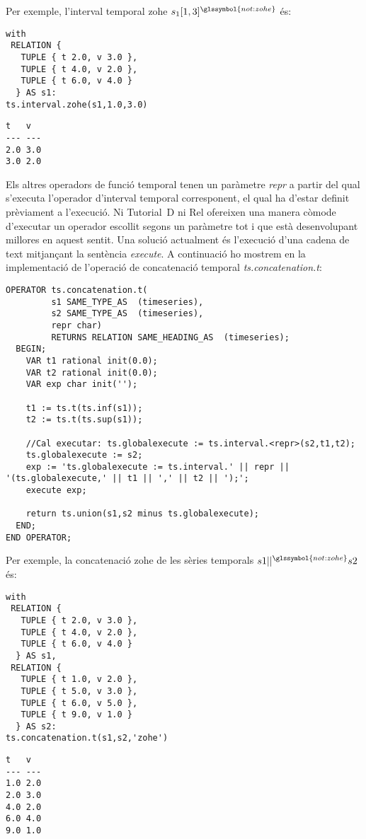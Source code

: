 Per exemple, l'interval temporal \gls{zohe} $s_1[1,3]^{\glssymbol{not:zohe}}$ és:
\begin{lstlisting}[style=tutorialD]
with 
 RELATION {
   TUPLE { t 2.0, v 3.0 },
   TUPLE { t 4.0, v 2.0 },
   TUPLE { t 6.0, v 4.0 }
  } AS s1: 
ts.interval.zohe(s1,1.0,3.0)
\end{lstlisting}
\begin{lstlisting}[style=stdout]
 t   v 
--- ---
2.0 3.0
3.0 2.0
\end{lstlisting}





Els altres operadors de funció temporal tenen un paràmetre \emph{repr}
a partir del qual s'executa l'operador d'interval temporal
corresponent, el qual ha d'estar definit prèviament a l'execució.  Ni
Tutorial~D ni Rel ofereixen una manera còmode d'executar un operador
escollit segons un paràmetre tot i que
\textcite{voorhis12:rel_anonymous_op} està desenvolupant millores en
aquest sentit. Una solució actualment és l'execució d'una cadena de
text mitjançant la sentència \emph{execute}. A continuació ho mostrem
en la implementació de l'operació de concatenació temporal
\emph{ts.concatenation.t}:
\begin{lstlisting}[style=tutorialD]
OPERATOR ts.concatenation.t(
         s1 SAME_TYPE_AS  (timeseries),
         s2 SAME_TYPE_AS  (timeseries),
         repr char)
         RETURNS RELATION SAME_HEADING_AS  (timeseries);
  BEGIN;
    VAR t1 rational init(0.0);
    VAR t2 rational init(0.0);
    VAR exp char init('');

    t1 := ts.t(ts.inf(s1));
    t2 := ts.t(ts.sup(s1));

    //Cal executar: ts.globalexecute := ts.interval.<repr>(s2,t1,t2); 
    ts.globalexecute := s2;
    exp := 'ts.globalexecute := ts.interval.' || repr || '(ts.globalexecute,' || t1 || ',' || t2 || ');';
    execute exp;
  
    return ts.union(s1,s2 minus ts.globalexecute);
  END;
END OPERATOR;
\end{lstlisting}


Per exemple, la concatenació \gls{zohe} de les sèries
temporals $s1 ||^{\glssymbol{not:zohe}} s2$ és:
\begin{lstlisting}[style=tutorialD]
with 
 RELATION {
   TUPLE { t 2.0, v 3.0 },
   TUPLE { t 4.0, v 2.0 },
   TUPLE { t 6.0, v 4.0 }
  } AS s1,
 RELATION {
   TUPLE { t 1.0, v 2.0 },
   TUPLE { t 5.0, v 3.0 },
   TUPLE { t 6.0, v 5.0 },
   TUPLE { t 9.0, v 1.0 }
  } AS s2: 
ts.concatenation.t(s1,s2,'zohe')
\end{lstlisting}
\begin{lstlisting}[style=stdout]
 t   v 
--- ---
1.0 2.0
2.0 3.0
4.0 2.0
6.0 4.0
9.0 1.0
\end{lstlisting}






